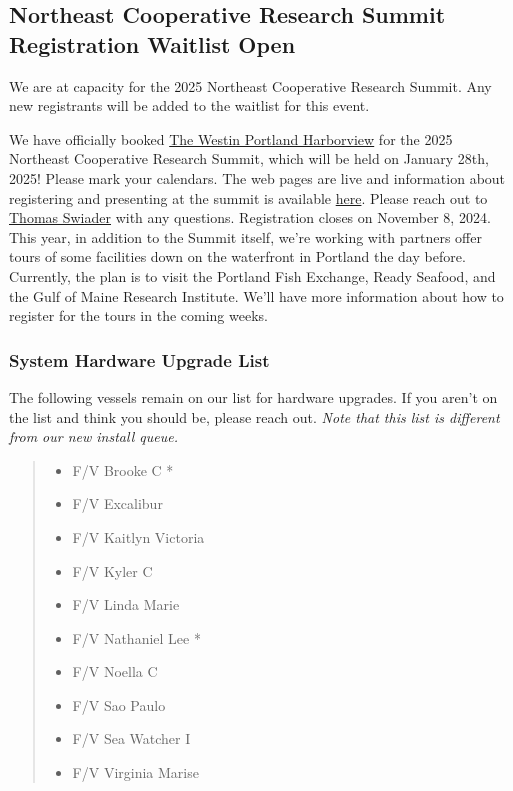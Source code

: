 \documentclass[
]{article}
\providecommand{\tightlist}{%
  \setlength{\itemsep}{0pt}\setlength{\parskip}{0pt}}
\begin{document}
\hypertarget{northeast-cooperative-research-summit-registration-waitlist-open}{%
\subsection{Northeast Cooperative Research Summit Registration Waitlist
Open}\label{northeast-cooperative-research-summit-registration-waitlist-open}}

We are at capacity for the 2025 Northeast Cooperative Research Summit.
Any new registrants will be added to the waitlist for this event.

We have officially booked
\href{https://maps.app.goo.gl/TRsvzYP6AogdDMXW9}{The Westin Portland
Harborview} for the 2025 Northeast Cooperative Research Summit, which
will be held on January 28th, 2025! Please mark your calendars. The web
pages are live and information about registering and presenting at the
summit is available
\href{https://www.fisheries.noaa.gov/event/2025-northeast-cooperative-research-summit}{here}.
Please reach out to
\href{https://www.fisheries.noaa.gov/contact/thomas-swiader}{Thomas
Swiader} with any questions. Registration closes on November 8, 2024.
This year, in addition to the Summit itself, we're working with partners
offer tours of some facilities down on the waterfront in Portland the
day before. Currently, the plan is to visit the Portland Fish Exchange,
Ready Seafood, and the Gulf of Maine Research Institute. We'll have more
information about how to register for the tours in the coming weeks.

\hypertarget{system-hardware-upgrade-list}{%
\subsubsection{System Hardware Upgrade
List}\label{system-hardware-upgrade-list}}

The following vessels remain on our list for hardware upgrades. If you
aren't on the list and think you should be, please reach out. \emph{Note
that this list is different from our new install queue.}

\begin{quote}
\begin{itemize}
\tightlist
\item
  F/V Brooke C *
\item
  F/V Excalibur
\item
  F/V Kaitlyn Victoria
\item
  F/V Kyler C
\item
  F/V Linda Marie
\item
  F/V Nathaniel Lee *
\item
  F/V Noella C
\item
  F/V Sao Paulo
\item
  F/V Sea Watcher I
\item
  F/V Virginia Marise
\end{itemize}
\end{quote}
\end{document}
